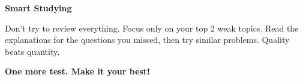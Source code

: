 {\begin{tcolorbox}[
    enhanced,
    colback=funYellowLight,
    colframe=funYellow!60,
    arc=10pt,
    boxrule=1pt,
    left=6mm, right=6mm, top=4mm, bottom=4mm,
]
{\bfseries\color{funYellowDark} \faLightbulb\hspace{2mm}Smart Studying}

\vspace{2mm}

Don't try to review everything. Focus only on your top 2 weak topics. Read the explanations for the questions you missed, then try similar problems. Quality beats quantity.
\end{tcolorbox}

\vspace{4mm}

\begin{center}
{\large\bfseries\color{funTealDark} \faRocket\hspace{2mm}One more test. Make it your best!\hspace{2mm}\faRocket}
\end{center}

}
\newpage
